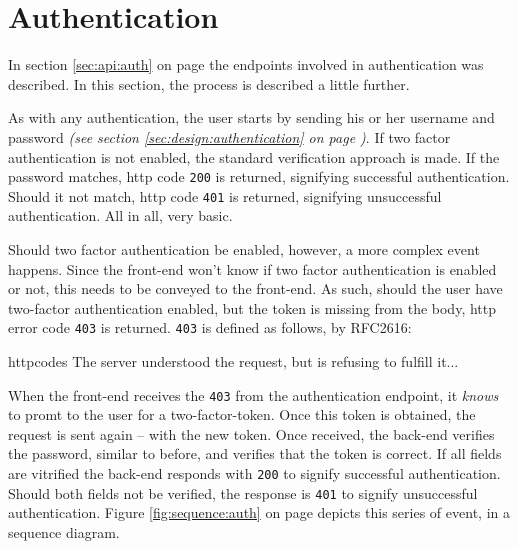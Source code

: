 	\section{Authentication}
		\label{sec:impl:authentication}
		In section \ref{sec:api:auth} on page \pageref{sec:api:auth} the endpoints involved in authentication was described. In this section, the process is described a little further. 

		As with any authentication, the user starts by sending his or her username and password \emph{(see section \ref{sec:design:authentication} on page \pageref{sec:design:authentication})}. If two factor authentication is not enabled, the standard verification approach is made. If the password matches, http code \verb=200= is returned, signifying successful authentication. Should it not match, http code \verb=401= is returned, signifying unsuccessful authentication. All in all, very basic.

		Should two factor authentication be enabled, however, a more complex event happens. Since the front-end won't know if two factor authentication is enabled or not, this needs to be conveyed to the front-end. As such, should the user have two-factor authentication enabled, but the token is missing from the body, http error code \verb=403= is returned. \verb=403= is defined as follows, by RFC2616\cite{httpcodes}:
		\begin{citequote}[sec.10.4.4]{httpcodes}
			   The server understood the request, but is refusing to fulfill it...
		\end{citequote}
		When the front-end receives the \verb=403= from the authentication endpoint, it \emph{knows} to promt to the user for a two-factor-token. Once this token is obtained, the request is sent again -- with the new token. Once received, the back-end verifies the password, similar to before, and verifies that the token is correct. If all fields are vitrified the back-end responds with \verb=200= to signify successful authentication. Should both fields not be verified, the response is \verb=401= to signify unsuccessful authentication. Figure \ref{fig:sequence:auth} on page \pageref{fig:sequence:auth} depicts this series of event, in a sequence diagram.

